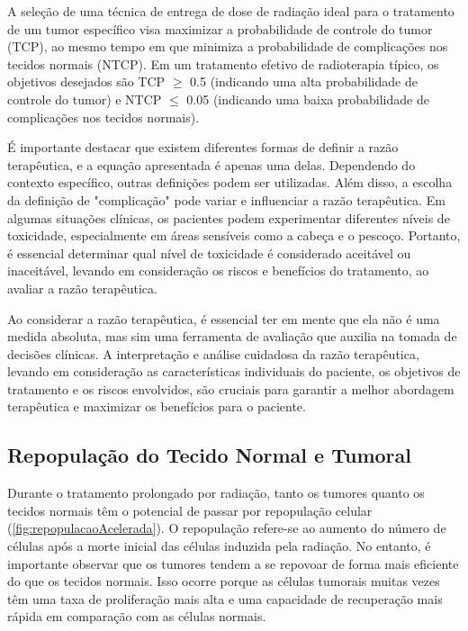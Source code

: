 \documentclass[11pt,a4paper]{article}
\begin{document}
	A seleção de uma técnica de entrega de dose de radiação ideal para o tratamento de um tumor específico visa maximizar a probabilidade de controle do tumor (TCP), ao mesmo tempo em que minimiza a probabilidade de complicações nos tecidos normais (NTCP). Em um tratamento efetivo de radioterapia típico, os objetivos desejados são TCP $\geq$ 0.5 (indicando uma alta probabilidade de controle do tumor) e NTCP $\leq$ 0.05 (indicando uma baixa probabilidade de complicações nos tecidos normais). 

	É importante destacar que existem diferentes formas de definir a razão terapêutica, e a equação apresentada é apenas uma delas. Dependendo do contexto específico, outras definições podem ser utilizadas. Além disso, a escolha da definição de "complicação" pode variar e influenciar a razão terapêutica. Em algumas situações clínicas, os pacientes podem experimentar diferentes níveis de toxicidade, especialmente em áreas sensíveis como a cabeça e o pescoço. Portanto, é essencial determinar qual nível de toxicidade é considerado aceitável ou inaceitável, levando em consideração os riscos e benefícios do tratamento, ao avaliar a razão terapêutica.

	Ao considerar a razão terapêutica, é essencial ter em mente que ela não é uma medida absoluta, mas sim uma ferramenta de avaliação que auxilia na tomada de decisões clínicas. A interpretação e análise cuidadosa da razão terapêutica, levando em consideração as características individuais do paciente, os objetivos de tratamento e os riscos envolvidos, são cruciais para garantir a melhor abordagem terapêutica e maximizar os benefícios para o paciente.
		
\subsection*{Repopulação do Tecido Normal e Tumoral}

	Durante o tratamento prolongado por radiação, tanto os tumores quanto os tecidos normais têm o potencial de passar por repopulação celular (\ref{fig:repopulacaoAcelerada}). O repopulação refere-se ao aumento do número de células após a morte inicial das células induzida pela radiação. No entanto, é importante observar que os tumores tendem a se repovoar de forma mais eficiente do que os tecidos normais. Isso ocorre porque as células tumorais muitas vezes têm uma taxa de proliferação mais alta e uma capacidade de recuperação mais rápida em comparação com as células normais.
\end{document}
